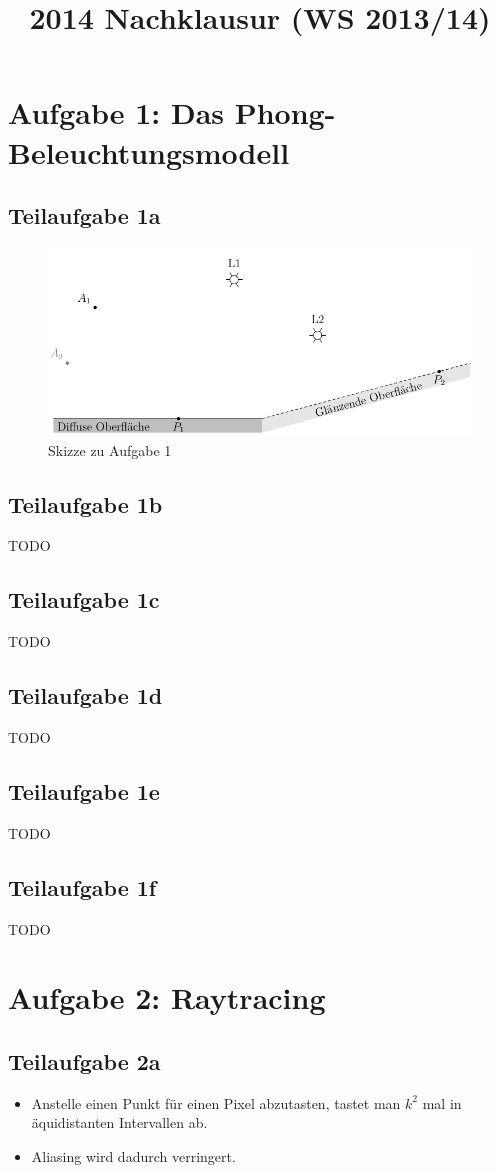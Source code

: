 \documentclass[a4paper]{scrartcl}
\begin{document}
\title{2014 Nachklausur (WS 2013/14)}

\setcounter{section}{1}
\section*{Aufgabe 1: Das Phong-Beleuchtungsmodell}
\subsection*{Teilaufgabe 1a}
\begin{figure}[h]
    \centering
    \includegraphics*[width=0.8\linewidth, keepaspectratio]{1a.png}
    \caption{Skizze zu Aufgabe 1}
    \label{fig:1a}
\end{figure}

\subsection*{Teilaufgabe 1b}
TODO
\subsection*{Teilaufgabe 1c}
TODO
\subsection*{Teilaufgabe 1d}
TODO
\subsection*{Teilaufgabe 1e}
TODO
\subsection*{Teilaufgabe 1f}
TODO

\section*{Aufgabe 2: Raytracing}
\subsection*{Teilaufgabe 2a}
\begin{itemize}
    \item Anstelle einen Punkt für einen Pixel abzutasten, tastet man
          $k^2$ mal in äquidistanten Intervallen ab.
    \item Aliasing wird dadurch verringert.
\end{itemize}
\end{document}
